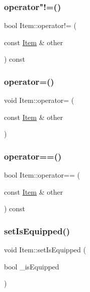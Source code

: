 \subsubsection{\texorpdfstring{operator"!=()}{operator!=()}}
{\footnotesize\ttfamily bool Item\+::operator!= (\begin{DoxyParamCaption}\item[{const \mbox{\hyperlink{class_item}{Item}} \&}]{other }\end{DoxyParamCaption}) const}

\mbox{\label{class_item_a47267a43bfae3f28e183170f45783da5}} 
\subsubsection{\texorpdfstring{operator=()}{operator=()}}
{\footnotesize\ttfamily void Item\+::operator= (\begin{DoxyParamCaption}\item[{const \mbox{\hyperlink{class_item}{Item}} \&}]{other }\end{DoxyParamCaption})}

\mbox{\label{class_item_a754d81f7346aebb775b16969a89021b4}} 
\subsubsection{\texorpdfstring{operator==()}{operator==()}}
{\footnotesize\ttfamily bool Item\+::operator== (\begin{DoxyParamCaption}\item[{const \mbox{\hyperlink{class_item}{Item}} \&}]{other }\end{DoxyParamCaption}) const}

\mbox{\label{class_item_ade0d63a4f02aa1a97f977b13f96eb891}} 
\subsubsection{\texorpdfstring{set\+Is\+Equipped()}{setIsEquipped()}}
{\footnotesize\ttfamily void Item\+::set\+Is\+Equipped (\begin{DoxyParamCaption}\item[{bool}]{\+\_\+is\+Equipped }\end{DoxyParamCaption})}

